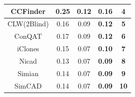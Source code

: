 \documentclass[review]{elsarticle}
\begin{document}
\begin{table}[]
\begin{tabular}{|c|c|c|c|c|}
CCFinder                                                            & 0.25                                                                   & 0.12                                                                 & \textbf{0.16}                                                         & \textbf{4}                                                                         \\ \hline
CLW(2Blind)                                                         & 0.16                                                                   & 0.09                                                                 & \textbf{0.12}                                                         & \textbf{5}                                                                         \\ \hline
ConQAT                                                              & 0.17                                                                   & 0.09                                                                 & \textbf{0.12}                                                         & \textbf{6}                                                                         \\ \hline
iClones                                                             & 0.15                                                                   & 0.07                                                                 & \textbf{0.10}                                                         & \textbf{7}                                                                         \\ \hline
Nicad                                                               & 0.13                                                                   & 0.07                                                                 & \textbf{0.09}                                                         & \textbf{8}                                                                         \\ \hline
Simian                                                              & 0.14                                                                   & 0.07                                                                 & \textbf{0.09}                                                         & \textbf{9}                                                                         \\ \hline
SimCAD                                                              & 0.14                                                                   & 0.07                                                                 & \textbf{0.09}                                                         & \textbf{10}                                                                        \\ \hline

\end{tabular}
\end{table}
\end{document}

